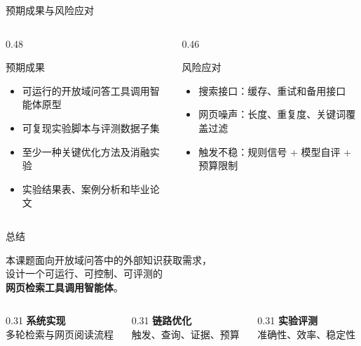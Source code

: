 \documentclass{sintefbeamer}
\newcommand{\kw}[1]{\textbf{\textcolor{sintefblue}{#1}}}
\newcommand{\tightlist}{\setlength{\itemsep}{0.45em}\setlength{\parskip}{0pt}}
\begin{document}
\begin{frame}{预期成果与风险应对}
  \begin{columns}[T]
    \begin{column}{0.48\textwidth}
      \begin{block}{预期成果}
        \begin{itemize}
          \tightlist
          \item 可运行的开放域问答工具调用智能体原型
          \item 可复现实验脚本与评测数据子集
          \item 至少一种关键优化方法及消融实验
          \item 实验结果表、案例分析和毕业论文
        \end{itemize}
      \end{block}
    \end{column}
    \begin{column}{0.46\textwidth}
      \begin{block}{风险应对}
        \begin{itemize}
          \tightlist
          \item 搜索接口：缓存、重试和备用接口
          \item 网页噪声：长度、重复度、关键词覆盖过滤
          \item 触发不稳：规则信号 + 模型自评 + 预算限制
        \end{itemize}
      \end{block}
    \end{column}
  \end{columns}
\end{frame}

\begin{frame}{总结}
  \begin{center}
    \large
    本课题面向开放域问答中的外部知识获取需求，\\[0.4em]
    设计一个可运行、可控制、可评测的\\[0.4em]
    \kw{网页检索工具调用智能体}。
  \end{center}
  \vspace{1em}
  \begin{columns}[T]
    \begin{column}{0.31\textwidth}
      \centering
      \kw{系统实现}\\
      {\small 多轮检索与网页阅读流程}
    \end{column}
    \begin{column}{0.31\textwidth}
      \centering
      \kw{链路优化}\\
      {\small 触发、查询、证据、预算}
    \end{column}
    \begin{column}{0.31\textwidth}
      \centering
      \kw{实验评测}\\
      {\small 准确性、效率、稳定性}
    \end{column}
  \end{columns}
\end{frame}

\backmatter
\end{document}
